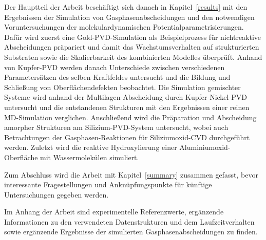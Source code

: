 Der Hauptteil der Arbeit beschäftigt sich danach in Kapitel~\ref{results} mit den Ergebnissen der Simulation von Gasphasenabscheidungen und den notwendigen Voruntersuchungen der molekulardynamischen Potentialparametrisierungen.
Dafür wird zuerst eine Gold-PVD-Simulation als Beispielprozess für nichtreaktive Abscheidungen präpariert und damit das Wachstumsverhalten auf strukturierten Substraten sowie die Skalierbarkeit des kombinierten Modelles überprüft.
Anhand von Kupfer-PVD werden danach Unterschiede zwischen verschiedenen Parametersätzen des selben Kraftfeldes untersucht und die Bildung und Schließung von Oberflächendefekten beobachtet.
Die Simulation gemischter Systeme wird anhand der Multilagen-Abscheidung durch Kupfer-Nickel-PVD untersucht und die entstandenen Strukturen mit den Ergebnissen einer reinen MD-Simulation verglichen.
Anschließend wird die Präparation und Abscheidung amorpher Strukturen am Silizium-PVD-System untersucht, wobei auch Betrachtungen der Gasphasen-Reaktionen für Siliziumoxid-CVD durchgeführt werden.
Zuletzt wird die reaktive Hydroxylierung einer Aluminiumoxid-Oberfläche mit Wassermolekülen simuliert.

Zum Abschluss wird die Arbeit mit Kapitel~\ref{summary} zusammen gefasst, bevor interessante Fragestellungen und Anknüpfungspunkte für künftige Untersuchungen gegeben werden.

Im Anhang der Arbeit sind experimentelle Referenzwerte, ergänzende Informationen zu den verwendeten Datenstrukturen und dem Laufzeitverhalten sowie ergänzende Ergebnisse der simulierten Gasphasenabscheidungen zu finden.
